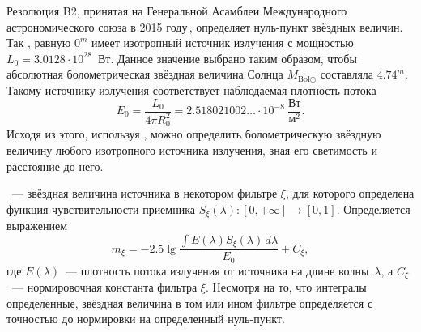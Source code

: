 Резолюция B2, принятая на Генеральной Асамблеи Международного астрономического союза в 2015 году\,\cite{bolometric-magnitude}, определяет нуль-пункт звёздных величин. Так , равную $0^m$ имеет изотропный источник излучения с мощностью $L_0 = 3.0128 \cdot 10^{28}$~Вт. Данное значение выбрано таким образом, чтобы абсолютная болометрическая звёздная величина Солнца $M_{\text{Bol}\odot}$ составляла $4.74^m$. Такому источнику излучения соответствует наблюдаемая плотность потока
\begin{equation}
    E_0 = \frac{L_0}{4\pi R_0^2} = 2.518021002\ldots \cdot 10^{-8}~\frac{\text{Вт}}{\text{м}^2}.
\end{equation}
Исходя из этого, используя , можно определить болометрическую звёздную величину любого изотропного источника излучения, зная его светимость и расстояние до него.

~--- звёздная величина источника в некотором фильтре $\xi$, для которого определена функция чувствительности приемника $S_\xi(\lambda): [0, +\infty] \rightarrow [0,1]$. Определяется выражением
\begin{equation}
    m_\xi = -2.5\lg \frac{\int E(\lambda) S_\xi(\lambda) \, d \lambda}{E_0} + C_\xi,
\end{equation}
где $E(\lambda)$~--- плотность потока излучения от источника на длине волны~$\lambda$, а $C_\xi$~--- нормировочная константа фильтра $\xi$. Несмотря на то, что интегралы определенные, звёздная величина в том или ином фильтре определяется с точностью до нормировки на определенный нуль-пункт.

